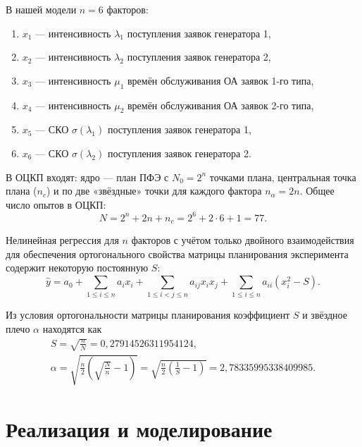 \documentclass[a4paper, 14pt]{extreport}
\begin{document}
\begin{MainPart}
В нашей модели $n = 6$ факторов:
\begin{enumerate}
	\item $x_1$ — интенсивность $\lambda_1$ поступления заявок генератора 1,
	\item $x_2$ — интенсивность $\lambda_2$ поступления заявок генератора 2,
	\item $x_3$ — интенсивность $\mu_1$ времён обслуживания ОА заявок 1-го типа,
	\item $x_4$ — интенсивность $\mu_2$ времён обслуживания ОА заявок 2-го типа,
	\item $x_5$ — СКО $\sigma(\lambda_1)$ поступления заявок генератора 1,
	\item $x_6$ — СКО $\sigma(\lambda_2)$ поступления заявок генератора 2.
\end{enumerate}

В ОЦКП входят: ядро — план ПФЭ с $N_0 = 2^n$ точками плана, центральная точка плана ($n_c$) и по две «звёздные» точки для каждого фактора $n_\alpha = 2n$.
Общее число опытов в ОЦКП:
\begin{equation}
	N = 2^n + 2n + n_c = 2^6 + 2 \cdot 6 + 1 = 77.
\end{equation}

Нелинейная регрессия для $n$ факторов с учётом только двойного взаимодействия для обеспечения ортогонального свойства матрицы планирования эксперимента содержит некоторую постоянную $S$:
\begin{equation}
	\hat y = a_0 + \sum_{1 \leqslant i \leqslant n}a_ix_i + \sum_{1 \leqslant i < j \leqslant n}a_{ij}x_ix_j + \sum_{1 \leqslant i \leqslant n}a_{ii}(x_i^2-S).
\end{equation}

Из условия ортогональности матрицы планирования коэффициент $S$ и звёздное плечо $\alpha$ находятся как
\begin{gather}
	S = \sqrt{\frac nN} = 0,27914526311954124, \\
	\alpha = \sqrt{\frac n2 \left(\sqrt{\frac Nn} - 1\right)} = \sqrt{\frac n2 \left(\frac1S - 1\right)} = 2,78335995338409985.
\end{gather}

\section{Реализация и моделирование}




\end{MainPart}
\end{document}
